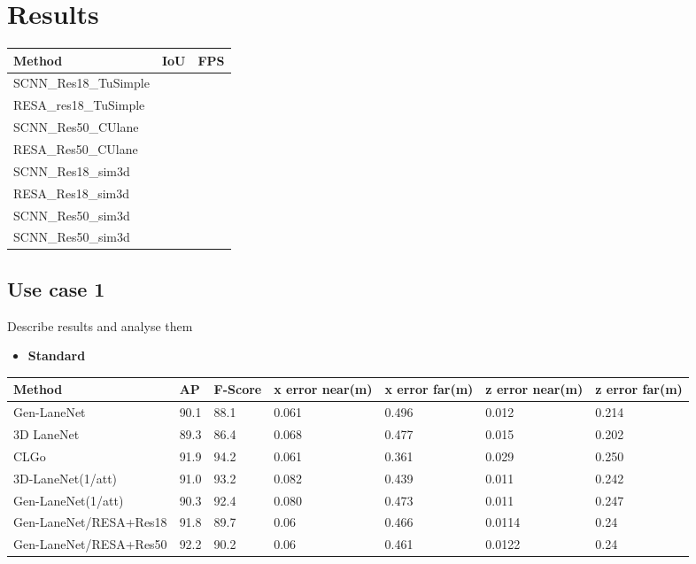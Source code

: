 

    \chapter{Results}
    
    \begin{table}[!ht]
    \centering
    \begin{tabular}{|l|l|l|}
    \hline
        \textbf{Method} & \textbf{IoU} & \textbf{FPS} \\ \hline
        SCNN\_Res18\_TuSimple & ~ & ~ \\ \hline
        RESA\_res18\_TuSimple & ~ & ~ \\ \hline
        SCNN\_Res50\_CUlane & ~ & ~ \\ \hline
        RESA\_Res50\_CUlane & ~ & ~ \\ \hline
        SCNN\_Res18\_sim3d & ~ & ~ \\ \hline
        RESA\_Res18\_sim3d & ~ & ~ \\ \hline
        SCNN\_Res50\_sim3d & ~ & ~ \\ \hline
        SCNN\_Res50\_sim3d & ~ & ~ \\ \hline
    \end{tabular}
\end{table}
    
    
    \section{Use case 1}

    Describe results and analyse them
    \begin{itemize}
        \item \textbf{Standard}
    \end{itemize}

    \begin{table}[!ht]
    \centering
    \begin{tabular}{|l|l|l|l|l|l|l|}
    \hline
        \textbf{Method} & \textbf{AP} & \textbf{F-Score} & \textbf{x error near(m)} & \textbf{x error far(m)} & \textbf{z error near(m)} & \textbf{z error far(m)} \\ \hline
        Gen-LaneNet & 90.1 & 88.1 & 0.061 & 0.496 & 0.012 & 0.214 \\ \hline
        3D LaneNet & 89.3 & 86.4 & 0.068 & 0.477 & 0.015 & 0.202 \\ \hline
        CLGo & 91.9 & 94.2 & 0.061 & 0.361 & 0.029 & 0.250 \\ \hline
        3D-LaneNet(1/att) & 91.0 & 93.2 & 0.082 & 0.439 & 0.011 & 0.242 \\ \hline
        Gen-LaneNet(1/att) & 90.3 & 92.4 & 0.080 & 0.473 & 0.011 & 0.247 \\ \hline
        Gen-LaneNet/RESA+Res18 & 91.8 & 89.7 & 0.06 & 0.466 & 0.0114 & 0.24 \\ \hline
        Gen-LaneNet/RESA+Res50 & 92.2 & 90.2 & 0.06 & 0.461 & 0.0122 & 0.24 \\ \hline
    \end{tabular}
\end{table}

